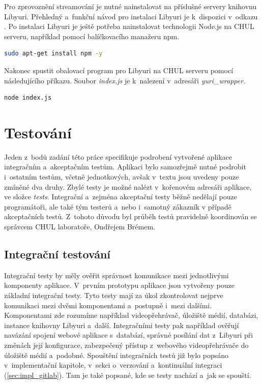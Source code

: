 \documentclass[thesis=M,czech]{FITthesis}[2012/06/26]
\begin{document}
Pro zprovoznění streamování je nutné nainstalovat na příslušné servery knihovnu Libyuri. Přehledný a~funkční návod pro instalaci Libyuri je k~dispozici v~odkazu \cite{yuri}. Po instalaci Libyuri je ještě potřeba nainstalovat technologii Node.js na CHUL serveru, například pomocí balíčkovacího manažeru npm.\\

\begin{lstlisting}[language=bash,identifierstyle=\color{black}]
sudo apt-get install npm -y
\end{lstlisting}

Nakonec spustit obalovací program pro Libyuri na CHUL serveru pomocí následujícího příkazu. Soubor \textit{index.js} je k~nalezení v~adresáři \textit{yuri\_wrapper}.\\

\begin{lstlisting}[language=bash,identifierstyle=\color{black}]
node index.js
\end{lstlisting}

\chapter{Testování} \label{chap:testovani}
Jeden z~bodů zadání této práce specifikuje podrobení vytvořené aplikace integračním a~akceptačním testům. Aplikaci bylo samozřejmě nutné podrobit i~ostatním testům, včetně jednotkových, avšak v~textu jsou uvedeny pouze zmíněné dva druhy. Zbylé testy je možné nalézt v~kořenovém adresáři aplikace, ve složce \textit{tests}. Integrační a~zejména akceptační testy běžně nedělají pouze programátoři, ale také tým testerů a~nebo i~samotný zákazník v případě akceptačních testů. Z~tohoto důvodu byl průběh testů pravidelně koordinován se správcem CHUL laboratoře, Ondřejem Brémem.
 
\section{Integrační testování} \label{sec:testovani_integracni}
Integrační testy by měly ověřit správnost komunikace mezi jednotlivými komponenty aplikace. V~prvním prototypu aplikace jsou vytvořeny pouze základní integrační testy. Tyto testy mají za úkol zkontrolovat nejprve komunikaci mezi dvěmi komponentami a~postupně i~mezi dalšími. Komponentami zde rozumíme například videopřehrávač, úložiště médií, databázi, instance knihovny Libyuri a~další. Integračními testy pak například ověřují navázání spojení webové aplikace s~databází, správné posílání dat z~Libyuri při změnách její konfigurace, zabezpečený přístup z~webového videopřehrávače do úložiště médií a~podobné. Spouštění integračních testů již bylo popsáno v~implementační kapitole, v~sekci o~verzování a~kontinuální integraci (\ref{sec:impl_gitlab}). Tam je také popsané, kde se testy nachází a~jak se spouští.
\end{document}
